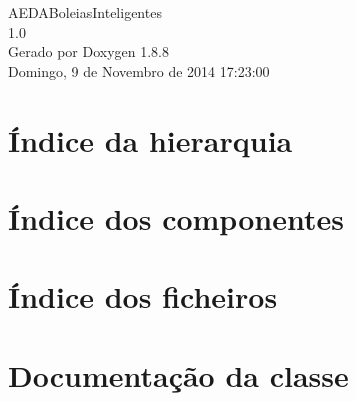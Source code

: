 \documentclass[twoside]{book}
\newcommand{\+}{\discretionary{\mbox{\scriptsize$\hookleftarrow$}}{}{}}
\newcommand{\clearemptydoublepage}{%
  \newpage{\pagestyle{empty}\cleardoublepage}%
}
\begin{document}
\hypersetup{pageanchor=false,
             bookmarks=true,
             bookmarksnumbered=true,
             pdfencoding=unicode
            }
\begin{titlepage}
\vspace*{7cm}
\begin{center}%
{\Large A\+E\+D\+A\+Boleias\+Inteligentes \\[1ex]\large 1.\+0 }\\
\vspace*{1cm}
{\large Gerado por Doxygen 1.8.8}\\
\vspace*{0.5cm}
{\small Domingo, 9 de Novembro de 2014 17:23:00}\\
\end{center}
\end{titlepage}
\clearemptydoublepage
\tableofcontents
\clearemptydoublepage
{}
\hypersetup{pageanchor=true}

\chapter{Índice da hierarquia}

\chapter{Índice dos componentes}

\chapter{Índice dos ficheiros}

\chapter{Documentação da classe}


























\end{document}
